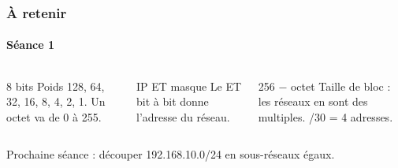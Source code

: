 \documentclass[aspectratio=169,10pt]{beamer}
\begin{document}
\begin{finale}
\begin{frame}
\frametitle{À retenir}
\framesubtitle{Séance 1}
\begin{columns}[T]
\begin{carte}[equal height group=finale,tag=01]{8 bits}
\small Poids 128, 64, 32, 16, 8, 4, 2, 1. Un octet va de 0 à 255.
\end{carte}
\begin{carte}[equal height group=finale,tag=02]{IP ET masque}
\small Le ET bit à bit donne l'adresse du réseau.
\end{carte}
\begin{carte}[equal height group=finale,tag=03]{256 − octet}
\small Taille de bloc : les réseaux en sont des multiples. /30 = 4 adresses.
\end{carte}
\end{columns}
\vfill
\begin{callout}[or]\small \cielfontlabel Prochaine séance : découper 192.168.10.0/24 en sous-réseaux égaux.\end{callout}
\end{frame}
\end{finale}
\end{document}
